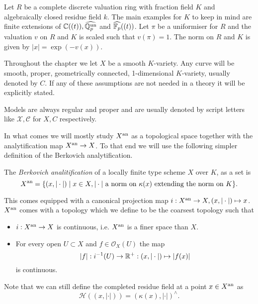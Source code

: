 Let $R$ be a complete discrete valuation ring with fraction field $K$ and algebraically closed residue field $k$. 
The main examples for $K$ to keep in mind are finite extensions of $\mathbb{C}((t)), \widehat{\mathbb{Q}_p^{\text{un}}} $ and $\widehat{\mathbb{F}_p}((t))$.  
Let $\pi$ be a uniformiser for $R$ and the valuation $v$ on $R$ and $K$ is scaled such that $v(\pi) = 1$. 
The norm on $R$ and $K$ is given by $|x| = \exp(-v(x))$. 

Throughout the chapter we let $X$ be a smooth $K$-variety. 
Any curve will be smooth, proper, geometrically connected, 1-dimensional $K$-variety, usually denoted by $C$. 
If any of these assumptions are not needed in a theory it will be explicitly stated. 

Models are always regular and proper and are usually denoted by script letters like $\mathscr X, \mathscr C$ for $X, C$ respectively.  


In what comes we will mostly study $X{}^{\text{an}}$ as a topological space together with the analytification map $X{}^{\text{an}} \to X$. 
To that end we will use the following simpler definition of the Berkovich analytification.

\begin{definition}\label{def:berkovich_analytification_explicit_chap_6}
	The \emph{Berkovich analitification} of a locally finite type scheme $X$ over  $K$, as a set is \[
		X{}^{\text{an}} = \{(x, |\cdot |)  \mid x\in X, |\cdot | \text{ a norm on } \kappa(x) \text{ extending the norm on }K \} 
	.\] 

	This comes equipped with a canonical projection map $i: X{}^{\text{an}} \to X, (x, |\cdot |) \mapsto  x$.
	$X{}^{\text{an}} $ comes with a topology which we define to be the coarsest topology such that 
	\begin{itemize}
		\item $i: X{}^{\text{an}} \to X$ is continuous, i.e. $X{}^{\text{an}}$ is a finer space than  $X$. 
		\item For every open $U \subset X$ and $f \in \mathcal{O}_X(U)$ the map  \[
				|f|: i^{-1}(U) \to \mathbb{R}^{+}: (x, |\cdot |) \mapsto  |f(x)|
		\] 
		is continuous.
	\end{itemize}
\end{definition}
Note that we can still define the completed residue field at a point $x \in X{}^{\text{an}}$ as \[
	\mathcal{H} ((x, |\cdot |)) = (\kappa(x), |\cdot |)^{\wedge}
.\] 
